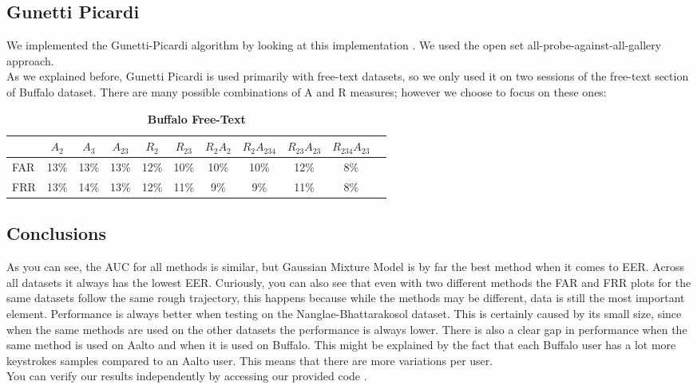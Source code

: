 \subsection{Gunetti Picardi}
We implemented the Gunetti-Picardi algorithm by looking at this implementation \cite{ref:gp-code}. We used the open set all-probe-against-all-gallery approach.\\

As we explained before, Gunetti Picardi is used primarily with free-text datasets, so we only used it on two sessions of the free-text section of Buffalo dataset. There are many possible combinations of A and R measures; however we choose to focus on these ones:
\begin{table}[H]
    \centering
    \begin{tabular}{|l|c|c|c|c|c|c|c|c|c|c} %
        \hline
         & $A_2$ & $A_3$ & $A_{23}$ & $R_2$ & $R_{23}$ & $R_2A_2$ & $R_2A_{234}$ & $R_{23}A_{23}$ & $R_{234}A_{23}$ \\
        \hline
        FAR & 13\% & 13\% & 13\% & 12\% & 10\% & 10\% & 10\% & 12\% & 8\% \\ %
        FRR & 13\% & 14\% & 13\% & 12\% & 11\% & 9\% & 9\% & 11\% & 8\% \\ %
        \hline
    \end{tabular}
    \caption{\textbf{Buffalo Free-Text}}
\end{table}
\FloatBarrier

\subsection{Conclusions}
As you can see, the AUC for all methods is similar, but Gaussian Mixture Model is by far the best method when it comes to EER. Across all datasets it always has the lowest EER. Curiously, you can also see that even with two different methods the FAR and FRR plots for the same datasets follow the same rough trajectory, this happens because while the methods may be different, data is still the most important element. Performance is always better when testing on the Nanglae-Bhattarakosol dataset. This is certainly caused by its small size, since when the same methods are used on the other datasets the performance is always lower. There is also a clear gap in performance when the same method is used on Aalto and when it is used on Buffalo. This might be explained by the fact that each Buffalo user has a lot more keystrokes samples compared to an Aalto user. This means that there are more variations per user.\\

You can verify our results independently by accessing our provided code \cite{ref:our-repo}.

\newpage